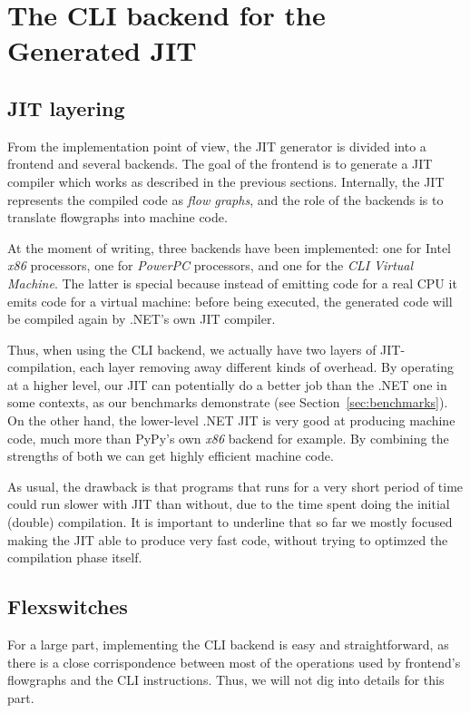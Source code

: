 \section{The CLI backend for the Generated JIT}
\label{sec:clibackend}

\subsection{JIT layering}

From the implementation point of view, the JIT generator is divided into a
frontend and several backends.  The goal of the frontend is to generate a JIT
compiler which works as described in the previous sections.  Internally, the
JIT represents the compiled code as \emph{flow graphs}, and the role of
the backends is to translate flowgraphs into machine code.

At the moment of writing, three backends have been implemented: one for Intel
\emph{x86} processors, one for \emph{PowerPC} processors, and one for the
\emph{CLI Virtual Machine}.  The latter is special because instead of emitting
code for a real CPU it emits code for a virtual machine: before being
executed, the generated code will be compiled again by .NET's own JIT
compiler.

Thus, when using the CLI backend, we actually have two layers of
JIT-compilation, each layer removing away different kinds of overhead.  By
operating at a higher level, our JIT can potentially do a better job than the
.NET one in some contexts, as our benchmarks demonstrate (see
Section~\ref{sec:benchmarks}).  On the other hand, the lower-level .NET JIT is
very good at producing machine code, much more than PyPy's own \emph{x86}
backend for example.  By combining the strengths of both we can get highly
efficient machine code.

As usual, the drawback is that programs that runs for a very short period of
time could run slower with JIT than without, due to the time spent doing the
initial (double) compilation.  It is important to underline that so far we
mostly focused making the JIT able to produce very fast code, without trying
to optimzed the compilation phase itself.

\subsection{Flexswitches}

For a large part, implementing the CLI backend is easy and straightforward, as
there is a close corrispondence between most of the operations used by
frontend's flowgraphs and the CLI instructions.  Thus, we will not dig into
details for this part.

